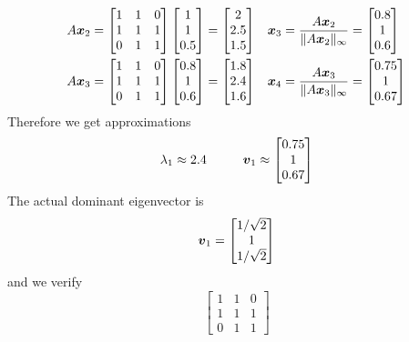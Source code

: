 \begin{example}
\begin{align*}
A \boldsymbol{x}_2 &=
\begin{bmatrix} 1 & 1 & 0 \\ 1 & 1 & 1 \\ 0 & 1 & 1 \end{bmatrix}
\begin{bmatrix} 1 \\ 1 \\ 0.5 \end{bmatrix}
=
\begin{bmatrix} 2 \\ 2.5 \\ 1.5 \end{bmatrix}
&
\boldsymbol{x}_3 = \frac{A \boldsymbol{x}_2}{\| A \boldsymbol{x}_2 \|_{\infty}}
&=
\begin{bmatrix} 0.8 \\ 1 \\ 0.6 \end{bmatrix}
\\
A \boldsymbol{x}_3 &=
\begin{bmatrix} 1 & 1 & 0 \\ 1 & 1 & 1 \\ 0 & 1 & 1 \end{bmatrix}
\begin{bmatrix} 0.8 \\ 1 \\ 0.6 \end{bmatrix}
=
\begin{bmatrix} 1.8 \\ 2.4 \\ 1.6 \end{bmatrix}
&
\boldsymbol{x}_4 = \frac{A \boldsymbol{x}_3}{\| A \boldsymbol{x}_3 \|_{\infty}}
&=
\begin{bmatrix} 0.75 \\ 1 \\ 0.67 \end{bmatrix}
\end{align*}
Therefore we get approximations
$$
\lambda_1 \approx 2.4
\hspace{10mm}
\bs{v}_1 \approx \begin{bmatrix} 0.75 \\ 1 \\ 0.67 \end{bmatrix}
$$
The actual dominant eigenvector is
$$
\boldsymbol{v}_1 = \begin{bmatrix} 1/\sqrt{2} \\ 1 \\ 1/\sqrt{2} \end{bmatrix}
$$
and we verify
$$
\begin{bmatrix} 1 & 1 & 0 \\ 1 & 1 & 1 \\ 0 & 1 & 1 \end{bmatrix}
$$
\end{example}
